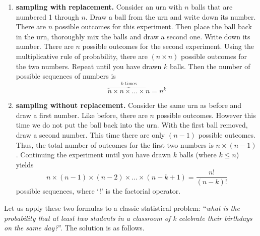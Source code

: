 \begin{enumerate}
\item{\bf sampling with replacement.} Consider an urn with $n$ balls
  that are numbered 1 through $n$. Draw a ball from the urn and write
  down its number. There are $n$ possible outcomes for this
  experiment.  Then place the ball back in the urn, thoroughly mix the
  balls and draw a second one. Write down its number. There are $n$
  possible outcomes for the second experiment. Using the
  multiplicative rule of probability, there are $(n\times{n})$
  possible outcomes for the two numbers. Repeat until you have drawn
  $k$ balls. Then the number of possible sequences of numbers is
  \begin{equation}
    \overset{k \mbox{~times}}{\overbrace{n\times{n}\times{\ldots}\times{n}}} = n^k
    \label{eq:withreplacement}
  \end{equation}
  
\item{\bf sampling without replacement.} Consider the same urn as
  before and draw a first number. Like before, there are $n$ possible
  outcomes.  However this time we do not put the ball back into the
  urn. With the first ball removed, draw a second number. This time
  there are only $(n - 1)$ possible outcomes. Thus, the total number
  of outcomes for the first two numbers is $n \times
  (n-1)$. Continuing the experiment until you have drawn $k$ balls
  (where $k \leq n$) yields
  \begin{equation}
    n\times(n-1)\times(n-2)\times{\ldots}\times(n-k+1) = \frac{n!}{(n-k)!}
    \label{eq:withoutreplacement}
  \end{equation}
  possible sequences, where `!' is the factorial operator.

\end{enumerate}

Let us apply these two formulas to a classic statistical problem:
``\textit{what is the probability that at least two students in a
  classroom of k celebrate their birthdays on the same day?}''. The
solution is as follows.


